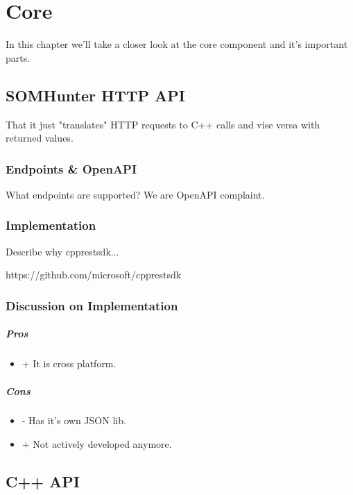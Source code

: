 \chapter{Core}
\label{comp-core}

In this chapter we'll take a closer look at the core component and it's important parts.

\section{SOMHunter HTTP API}
That it just "translates" HTTP requests to C++ calls and vise versa with returned values.

\subsection{Endpoints \& OpenAPI}
What endpoints are supported? We are OpenAPI complaint.

\subsection{Implementation}
Describe why cpprestsdk...

https://github.com/microsoft/cpprestsdk

\subsection{Discussion on Implementation}

\paragraph{Pros}
\begin{itemize}
	\item + It is cross platform.
\end{itemize}

\paragraph{Cons}
\begin{itemize}
	\item - Has it's own JSON lib.
	\item + Not actively developed anymore.
\end{itemize}



\section{C++ API}

